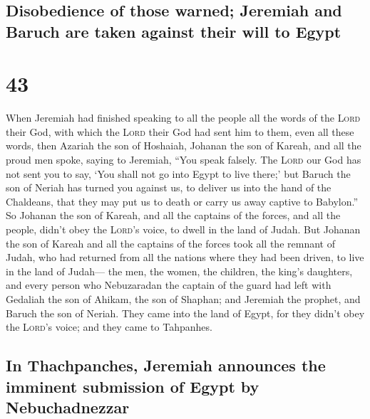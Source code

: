 \hypertarget{disobedience-of-those-warned-jeremiah-and-baruch-are-taken-against-their-will-to-egypt}{%
\subsection{Disobedience of those warned; Jeremiah and Baruch are taken
against their will to
Egypt}\label{disobedience-of-those-warned-jeremiah-and-baruch-are-taken-against-their-will-to-egypt}}

\hypertarget{section-42}{%
\section{43}\label{section-42}}

 When Jeremiah had finished speaking to all the people all
the words of the \textsc{Lord} their God, with which the \textsc{Lord}
their God had sent him to them, even all these words, 
then Azariah the son of Hoshaiah, Johanan the son of Kareah, and all the
proud men spoke, saying to Jeremiah, ``You speak falsely. The
\textsc{Lord} our God has not sent you to say, `You shall not go into
Egypt to live there;'  but Baruch the son of Neriah has
turned you against us, to deliver us into the hand of the Chaldeans,
that they may put us to death or carry us away captive to Babylon.''
 So Johanan the son of Kareah, and all the captains of the
forces, and all the people, didn't obey the \textsc{Lord}'s voice, to
dwell in the land of Judah.  But Johanan the son of Kareah
and all the captains of the forces took all the remnant of Judah, who
had returned from all the nations where they had been driven, to live in
the land of Judah---  the men, the women, the children,
the king's daughters, and every person who Nebuzaradan the captain of
the guard had left with Gedaliah the son of Ahikam, the son of Shaphan;
and Jeremiah the prophet, and Baruch the son of Neriah. 
They came into the land of Egypt, for they didn't obey the
\textsc{Lord}'s voice; and they came to Tahpanhes.

\hypertarget{in-thachpanches-jeremiah-announces-the-imminent-submission-of-egypt-by-nebuchadnezzar}{%
\subsection{In Thachpanches, Jeremiah announces the imminent submission
of Egypt by
Nebuchadnezzar}\label{in-thachpanches-jeremiah-announces-the-imminent-submission-of-egypt-by-nebuchadnezzar}}

